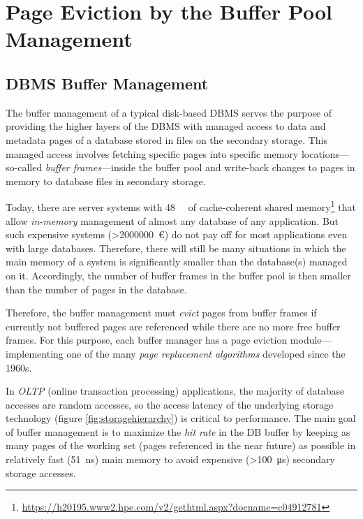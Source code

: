 \chapter[Buffer Manager Page Eviction]{Page Eviction by the Buffer Pool Management} \label{ch:page_evictioners}

\section{DBMS Buffer Management} \label{sec:page_evictioners_purpose}

    The buffer management of a typical disk-based DBMS serves the purpose of providing the higher layers of the DBMS with managed access to data and metadata pages of a database stored in files on the secondary storage. This managed access involves fetching specific pages into specific memory locations---so-called \emph{buffer frames}---inside the buffer pool and write-back changes to pages in memory to database files in secondary storage.

    Today, there are server systems with \SI{48}{\tebi\byte} of cache-coherent shared memory\footnote{\url{https://h20195.www2.hpe.com/v2/gethtml.aspx?docname=c04912781}} that allow \emph{in-memory} management of almost any database of any application. But such expensive systems (\SI{>2000000}{\euro}) do not pay off for most applications even with large databases. Therefore, there will still be many situations in which the main memory of a system is significantly smaller than the database(s) managed on it. Accordingly, the number of buffer frames in the buffer pool is then smaller than the number of pages in the database.

    Therefore, the buffer management must \emph{evict} pages from buffer frames if currently not buffered pages are referenced while there are no more free buffer frames. For this purpose, each buffer manager has a page eviction module---implementing one of the many \emph{page replacement algorithms} developed since the 1960s.

    In \emph{OLTP} (online transaction processing) applications, the majority of database accesses are random accesses, so the access latency of the underlying storage technology (figure \ref{fig:storagehierarchy}) is critical to performance. The main goal of buffer management is to maximize the \emph{hit rate} in the DB buffer by keeping as many pages of the working set (pages referenced in the near future) as possible in relatively fast (\SI{51}{\nano\second}) main memory to avoid expensive (\SI{>100}{\micro\second}) secondary storage accesses.

